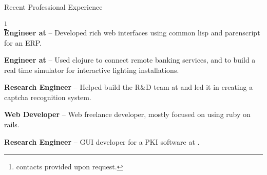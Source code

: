 \begin{rubric}{Recent Professional Experience}{ \footnote{contacts
provided upon request.}  \\

    \entry*[2013-06 - Present] \textbf{Engineer at
} --
Developed rich web interfaces using common lisp and parenscript for an
ERP.

    \entry*[2012 - 2013-06] \textbf{Engineer at
} --
Used clojure to connect remote banking services, and to build a real time
simulator for interactive lighting installations.

    \entry*[2010 - 2012] \textbf{Research Engineer} -- Helped build
the R\&D team at 
and led it in creating a captcha recognition system.

    \entry*[2007-2009] \textbf{Web Developer} -- Web freelance
developer, mostly focused on using ruby on rails.

    \entry*[2005 - 2007] \textbf{Research Engineer} -- GUI developer
for a PKI software at .

}
\end{rubric}
